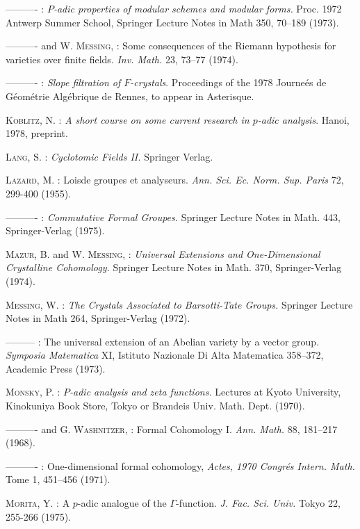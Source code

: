 \begin{thebibliography}{99}
 ---------- : {\em $P$-adic properties of modular schemes and modular forms.} Proc. 1972 Antwerp Summer School, Springer Lecture Notes in Math 350, 70--189 (1973).

 ---------- and W. \textsc{Messing}, : Some consequences of the Riemann hypothesis for varieties over finite fields. {\em Inv. Math.} 23, 73--77 (1974).

 ---------- : {\em Slope filtration of $F$-crystals}. Proceedings of the 1978 Journe\'es de G\'eom\'etrie Alg\'ebrique de Rennes, to appear in Asterisque.

 \textsc{Koblitz,} N. : {\em A short course on some current research in $p$-adic analysis}. Hanoi, 1978, preprint.

 \textsc{Lang,} S. : {\em Cyclotomic Fields II.} Springer Verlag.

 \textsc{Lazard,} M. : Lois\pageoriginale de groupes et analyseurs. {\em Ann. Sci. Ec. Norm. Sup. Paris} 72, 299-400 (1955).

 ---------- : {\em Commutative Formal Groupes.} Springer Lecture Notes in Math. 443, Springer-Verlag (1975).

 \textsc{Mazur,} B. and W. \textsc{Messing,} : {\em Universal Extensions and One-Dimensional Crystalline Cohomology.} Springer Lecture Notes in Math. 370, Springer-Verlag (1974).

 \textsc{Messing,} W. : {\em The Crystals Associated to Barsotti-Tate Groups.} Springer Lecture Notes in Math 264, Springer-Verlag (1972).

 --------- : The universal extension of an Abelian variety by a vector group. {\em Symposia Matematica} XI, Istituto Nazionale Di Alta Matematica 358--372, Academic Press (1973).

 \textsc{Monsky,} P. : {\em $P$-adic analysis and zeta functions.} Lectures at Kyoto University, Kinokuniya Book Store, Tokyo or Brandeis Univ. Math. Dept. (1970).

 ---------- and G. \textsc{Washnitzer,} : Formal Cohomology I. {\em Ann. Math.} 88, 181--217 (1968).

 ---------- : One-dimensional formal cohomology, {\em Actes, 1970 Congr\'es Intern. Math.} Tome 1, 451--456 (1971).

 \textsc{Morita,} Y. : A $p$-adic analogue of the $\Gamma$-function. {\em J. Fac. Sci. Univ.} Tokyo 22, 255-266 (1975).


\end{thebibliography}
